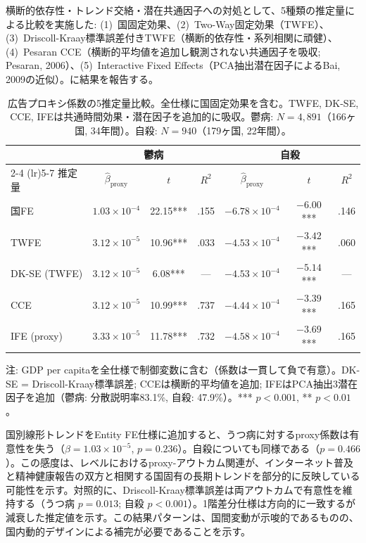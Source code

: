 \documentclass[a4paper,11pt,titlepage]{article}
\begin{document}
\label{sec:csd-robustness}横断的依存性・トレンド交絡・潜在共通因子への対処として、5種類の推定量による比較を実施した: (1)~国固定効果、(2)~Two-Way固定効果（TWFE）、(3)~Driscoll-Kraay標準誤差付きTWFE（横断的依存性・系列相関に頑健）、(4)~Pesaran CCE（横断的平均値を追加し観測されない共通因子を吸収; Pesaran, 2006）、(5)~Interactive Fixed Effects（PCA抽出潜在因子によるBai, 2009の近似）。に結果を報告する。

\begin{table}[htbp]
\centering
\caption{広告プロキシ係数の5推定量比較。全仕様に国固定効果を含む。TWFE, DK-SE, CCE, IFEは共通時間効果・潜在因子を追加的に吸収。鬱病: $N = 4{,}891$（166ヶ国, 34年間）。自殺: $N = 940$（179ヶ国, 22年間）。}
\label{tab:cce-ife}
\small
\begin{tabular}{lcccccc}
\hline
& \multicolumn{3}{c}{\textbf{鬱病}} & \multicolumn{3}{c}{\textbf{自殺}} \\
\cmidrule(lr){2-4} \cmidrule(lr){5-7}
推定量 & $\hat{\beta}_{\text{proxy}}$ & $t$ & $R^2$ & $\hat{\beta}_{\text{proxy}}$ & $t$ & $R^2$ \\
\hline
国FE          & $1.03 \times 10^{-4}$ & 22.15*** & .155 & $-6.78 \times 10^{-4}$ & $-6.00$*** & .146 \\
TWFE          & $3.12 \times 10^{-5}$ & 10.96*** & .033 & $-4.53 \times 10^{-4}$ & $-3.42$*** & .060 \\
DK-SE (TWFE)  & $3.12 \times 10^{-5}$ &  6.08*** &  —  & $-4.53 \times 10^{-4}$ & $-5.14$*** &  —  \\
CCE           & $3.12 \times 10^{-5}$ & 10.99*** & .737 & $-4.44 \times 10^{-4}$ & $-3.39$*** & .165 \\
IFE (proxy)   & $3.33 \times 10^{-5}$ & 11.78*** & .732 & $-4.58 \times 10^{-4}$ & $-3.69$*** & .165 \\
\hline
\end{tabular}
\par\smallskip
\footnotesize{注: GDP per capitaを全仕様で制御変数に含む（係数は一貫して負で有意）。DK-SE = Driscoll-Kraay標準誤差; CCEは横断的平均値を追加; IFEはPCA抽出3潜在因子を追加（鬱病: 分散説明率83.1\%, 自殺: 47.9\%）。*** $p < 0.001$, ** $p < 0.01$。}
\end{table}

国別線形トレンドをEntity FE仕様に追加すると、うつ病に対するproxy係数は有意性を失う（$\beta = 1.03 \times 10^{-5}$, $p = 0.236$）。自殺についても同様である（$p = 0.466$）。この感度は、レベルにおけるproxy-アウトカム関連が、インターネット普及と精神健康報告の双方と相関する国固有の長期トレンドを部分的に反映している可能性を示す。対照的に、Driscoll-Kraay標準誤差は両アウトカムで有意性を維持する（うつ病 $p = 0.013$; 自殺 $p < 0.001$）。1階差分仕様は方向的に一致するが減衰した推定値を示す。この結果パターンは、国間変動が示唆的であるものの、国内動的デザインによる補完が必要であることを示す。
\end{document}
